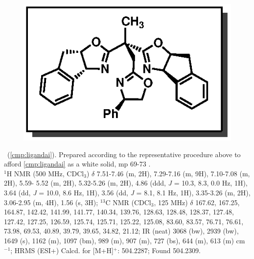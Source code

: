 \vspace{10pt}
\begin{figure}
  \vspace{-30pt}
  \begin{center}
    \includegraphics[scale=0.8]{chp_asymmetric/images/ligandai}
  \end{center}
  \vspace{-30pt}
\end{figure}
\noindent \textbf{\CMPligandai}\ (\ref{cmp:ligandai}).  Prepared according to the representative
procedure above to afford \ref{cmp:ligandai} as a white solid, mp 69-73 \degc. \\
$^1$H NMR (500 MHz, CDCl$_3$) $\delta$ 7.51-7.46 (m, 2H), 7.29-7.16 (m, 9H), 7.10-7.08 (m, 2H),
5.59- 5.52 (m, 2H), 5.32-5.26 (m, 2H), 4.86 (ddd, \textit{J} = 10.3, 8.3, 0.0 Hz, 1H), 3.64 (dd,
\textit{J} = 10.0, 8.6 Hz, 1H), 3.56 (dd, \textit{J} = 8.1, 8.1 Hz, 1H), 3.35-3.26 (m, 2H),
3.06-2.95 (m, 4H), 1.56 (s, 3H); $^{13}$C NMR (CDCl$_3$, 125 MHz) $\delta$ 167.62, 167.25, 164.87,
142.42, 141.99, 141.77, 140.34, 139.76, 128.63, 128.48, 128.37, 127.48, 127.42, 127.25, 126.59,
125.74, 125.71, 125.22, 125.08, 83.60, 83.57, 76.71, 76.61, 73.98, 69.53, 40.89, 39.79, 39.65,
34.82, 21.12; IR (neat) 3068 (bw), 2939 (bw), 1649 (s), 1162 (m), 1097 (bm), 989 (m), 907 (m), 727
(bs), 644 (m), 613 (m) cm$^{-1}$; HRMS (ESI+) Calcd. for  [M+H]$^+$: 504.2287; Found
504.2309.


